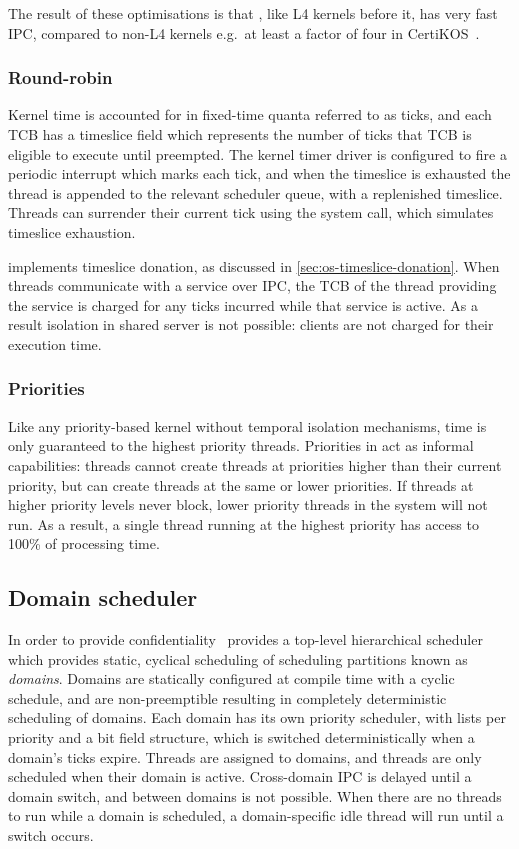 The result of these optimisations is that \selfour, like L4 kernels before it, has very fast
\gls{IPC}, compared to non-L4 kernels e.g.\ at least a factor of four in CertiKOS~\citep{Gu_SCWKSC_16}.

\subsubsection{Round-robin}
\label{sec:seL4-round-robin}

Kernel time is accounted for in fixed-time quanta referred to as ticks, and each TCB has a timeslice
field which represents the number of ticks that TCB is eligible to execute until preempted.
The kernel timer driver is configured to fire a periodic interrupt which marks each tick,
and when the timeslice is exhausted the thread is appended to the relevant scheduler queue,
with a replenished timeslice.
Threads can surrender their current tick using the \yield system call, which simulates
timeslice exhaustion. 

\selfour implements timeslice donation, as discussed in \cref{sec:os-timeslice-donation}. 
When threads communicate with a service over \gls{IPC}, the TCB of the thread providing the service
is charged for any ticks incurred while that service is active. As a result isolation in shared
server is not possible: clients are not charged for their execution time.

\subsubsection{Priorities}

Like any priority-based kernel without temporal isolation mechanisms, time is only guaranteed to the highest priority threads.
Priorities in \selfour act as informal capabilities: threads cannot create threads at priorities higher than their current priority, but can create threads at the same or lower priorities.
If threads at higher priority levels never block, lower priority threads in the system will not run.
As a result, a single thread running at the highest priority has access to 100\% of processing time.

\subsection{Domain scheduler}

In order to provide confidentiality~\citep{Murray_MBGBSLGK_13} \selfour provides a top-level hierarchical scheduler
which provides static, cyclical scheduling of scheduling partitions known as \emph{domains}. 
Domains are statically configured at compile time with a cyclic schedule, and are non-preemptible
resulting in completely deterministic scheduling of domains.
Each domain has its own priority scheduler, with lists per priority and a bit field structure, which is switched deterministically when a domain's
ticks expire. 
Threads are assigned to domains, and threads are only scheduled when their domain is active.
Cross-domain \gls{IPC} is delayed until a domain switch, and \yield between domains is not
possible. When there are no threads to run while a domain is scheduled, a domain-specific idle thread will run until a switch occurs.

